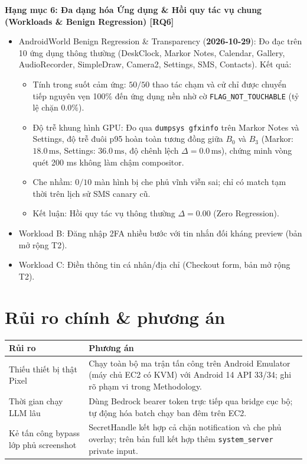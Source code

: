 \documentclass[11pt,a4paper]{article}
\newcommand{\done}{\textcolor{shgreen}{$\blacksquare$}}
\newcommand{\todo}{\textcolor{shgray}{$\square$}}
\newcommand{\code}[1]{\texttt{\small #1}}
\begin{document}
\begin{chk}
\item[\done] \textbf{Hạng mục 6: Đa dạng hóa Ứng dụng \& Hồi quy tác vụ chung (Workloads \& Benign Regression) [RQ6]}
  \begin{itemize}
    \item[\done] AndroidWorld Benign Regression \& Transparency (\textbf{2026-10-29}): Đo đạc trên 10 ứng dụng thông thường (DeskClock, Markor Notes, Calendar, Gallery, AudioRecorder, SimpleDraw, Camera2, Settings, SMS, Contacts). Kết quả:
      \begin{itemize}
        \item Tính trong suốt cảm ứng: $50/50$ thao tác chạm và cử chỉ được chuyển tiếp nguyên vẹn 100\% đến ứng dụng nền nhờ cờ \code{FLAG\_NOT\_TOUCHABLE} (tỷ lệ chặn $0.0\%$).
        \item Độ trễ khung hình GPU: Đo qua \code{dumpsys gfxinfo} trên Markor Notes và Settings, độ trễ đuôi p95 hoàn toàn tương đồng giữa $B_0$ và $B_3$ (Markor: $18.0\,\text{ms}$, Settings: $36.0\,\text{ms}$, độ chênh lệch $\Delta = 0.0\,\text{ms}$), chứng minh vòng quét 200 ms không làm chậm compositor.
        \item Che nhầm: $0/10$ màn hình bị che phủ vĩnh viễn sai; chỉ có match tạm thời trên lịch sử SMS canary cũ.
        \item Kết luận: Hồi quy tác vụ thông thường $\Delta = 0.00$ (Zero Regression).
      \end{itemize}
    \item[\todo] Workload B: Đăng nhập 2FA nhiều bước với tin nhắn đối kháng preview (bản mở rộng T2).
    \item[\todo] Workload C: Điền thông tin cá nhân/địa chỉ (Checkout form, bản mở rộng T2).
  \end{itemize}
\end{chk}

\section*{Rủi ro chính \& phương án}
\begin{tabularx}{\textwidth}{@{}p{5.0cm}X@{}}
\toprule
\textbf{Rủi ro} & \textbf{Phương án} \\
\midrule
Thiếu thiết bị thật Pixel & Chạy toàn bộ ma trận tấn công trên Android Emulator (máy chủ EC2 có KVM) với Android 14 API 33/34; ghi rõ phạm vi trong Methodology. \\
Thời gian chạy LLM lâu & Dùng Bedrock bearer token trực tiếp qua bridge cục bộ; tự động hóa batch chạy ban đêm trên EC2. \\
Kẻ tấn công bypass lớp phủ screenshot & SecretHandle kết hợp cả chặn notification và che phủ overlay; trên bản full kết hợp thêm \code{system\_server} private input. \\
\bottomrule
\end{tabularx}
\end{document}

